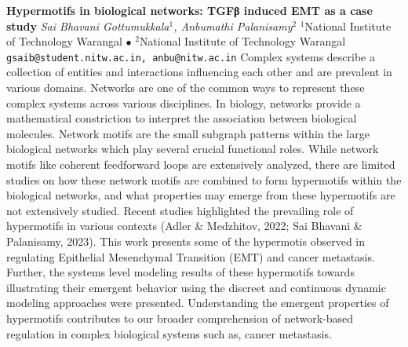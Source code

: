 
    \begin{conf-abstract}[]
        {\textbf{Hypermotifs in biological networks: TGFβ induced EMT as a case study}}
        {\textit{Sai Bhavani Gottumukkala$^{1}$, Anbumathi Palanisamy$^{2}$}}
        {$^{1}$National Institute of Technology Warangal $\bullet$ $^{2}$National Institute of Technology Warangal}
        {\texttt{gsaib@student.nitw.ac.in, anbu@nitw.ac.in}}
        {Complex systems describe a collection of entities and interactions influencing each other and are prevalent in various domains. Networks are one of the common ways to represent these complex systems across various disciplines. In biology, networks provide a mathematical constriction to interpret the association between biological molecules. Network motifs are the small subgraph patterns within the large biological networks which play several crucial functional roles. While network motifs like coherent feedforward loops are extensively analyzed, there are limited studies on how these network motifs are combined to form hypermotifs within the biological networks, and what properties may emerge from these hypermotifs are not extensively studied. Recent studies highlighted the prevailing role of hypermotifs in various contexts (Adler \& Medzhitov, 2022; Sai Bhavani \& Palanisamy, 2023). This work presents some of the hypermotis observed in regulating Epithelial Mesenchymal Transition (EMT) and cancer metastasis. Further, the systems level modeling results of these hypermotifs towards illustrating their emergent behavior using the discreet and continuous dynamic modeling approaches were presented. Understanding the emergent properties of hypermotifs contributes to our broader comprehension of network-based regulation in complex biological systems such as,  cancer metastasis. }
    \end{conf-abstract}
        